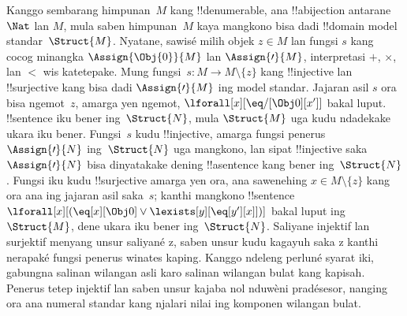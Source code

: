 \documentclass[../../../include/open-logic-section]{subfiles}
\begin{document}
\begin{explain}
Kanggo sembarang himpunan~$M$
kang !!{denumerable},
ana !!a{bijection}
antarane $\Nat$ lan
$M$, mula saben himpunan~$M$
kaya mangkono bisa dadi
!!{domain} model
standar~$\Struct{M}$.
Nyatane, sawisé milih
objek $z \in M$
lan fungsi $s$
kang cocog minangka
$\Assign{\Obj{0}}{M}$
lan $\Assign{\prime}{M}$,
interpretasi $+$,
$\times$, lan $<$
wis katetepake.
Mung fungsi~$s\colon
M \to M \setminus \{z\}$
kang !!{injective}
lan !!{surjective}
kang bisa dadi
$\Assign{\prime}{M}$
ing model standar.
Jajaran asil $s$
ora bisa ngemot~$z$,
amarga yen ngemot,
$\lforall[x][
\eq/[\Obj 0][x']]$
bakal luput.
!!{sentence} iku
bener ing~$\Struct{N}$,
mula $\Struct{M}$
uga kudu ndadekake
ukara iku bener.
Fungsi~$s$ kudu
!!{injective},
amarga fungsi penerus
$\Assign{\prime}{N}$
ing~$\Struct{N}$
uga mangkono, lan
sipat !!{injective}
saka $\Assign{\prime}{N}$
bisa dinyatakake
dening !!a{sentence}
kang bener ing~$\Struct{N}$.
Fungsi iku kudu
!!{surjective}
amarga yen ora,
ana sawenehing
$x \in M \setminus \{z\}$
kang ora ana ing
jajaran asil saka~$s$;
kanthi mangkono
!!{sentence}
$\lforall[x][(
\eq[x][\Obj 0] \lor
\lexists[y][\eq[y'][x]])]$
bakal luput ing~$\Struct{M}$,
dene ukara iku bener
ing~$\Struct{N}$.
 Saliyane injektif lan surjektif menyang unsur saliyané z, saben unsur kudu kagayuh saka z kanthi nerapaké fungsi penerus winates kaping. Kanggo ndeleng perluné syarat iki, gabungna salinan wilangan asli karo salinan wilangan bulat kang kapisah. Penerus tetep injektif lan saben unsur kajaba nol nduwèni pradésesor, nanging ora ana numeral standar kang njalari nilai ing komponen wilangan bulat.
\end{explain}
\end{document}
